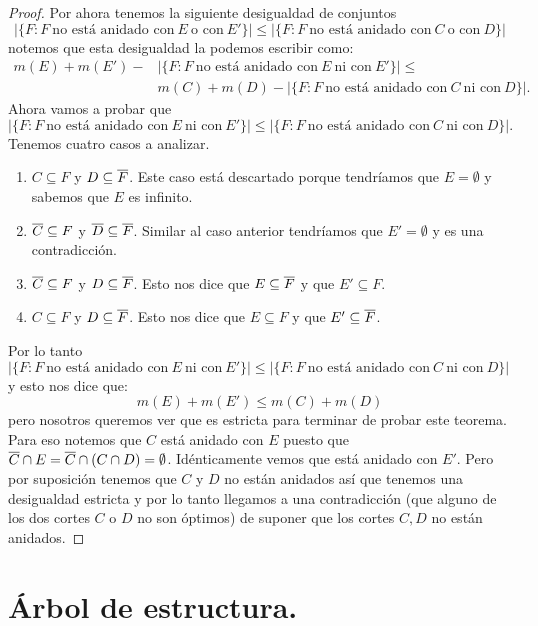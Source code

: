 \documentclass[tesis.tex]{subfiles}
\begin{document}
\begin{proof}
	Por ahora tenemos la siguiente desigualdad de conjuntos
	\[
		|\{ F : F \ \text{no está anidado con} \ E \ \text{o con} \  E' \}| \le |\{ F : F \  \text{no está anidado con} \ C \ \text{o con} \ D \}|
	\]
	notemos que esta desigualdad la podemos escribir como:
	\begin{align*}
		m(E) + m(E') - &|\{ F : F \ \text{no está anidado con} \ E \ \text{ni con} \ E' \}| \le \\
		&m(C) + m(D) - |\{ F : F \ \text{no está anidado con} \ C \ \text{ni con} \ D \}|.
	\end{align*}
	Ahora vamos a probar que 
	\[
		|\{ F : F \ \text{no está anidado con} \ E \ \text{ni con} \ E' \}| \le |\{ F : F \ \text{no está anidado con} \ C \ \text{ni con} \ D \}|.
	\]
	Tenemos cuatro casos a analizar.
	\begin{enumerate}
		\item $C \subseteq F$ y $D \subseteq \overline F$.
		Este caso está descartado porque tendríamos que $E=\emptyset$ y sabemos que $E$ es infinito. 
		\item $\overline C \subseteq F$ y $\overline D \subseteq \overline F$.
		Similar al caso anterior tendríamos que $E' = \emptyset$ y es una contradicción.
		\item $\overline C \subseteq F$ y $D \subseteq \overline F$.
		Esto nos dice que $E \subseteq \overline F$ y que $E' \subseteq F$.
		\item $ C \subseteq F$ y $D \subseteq \overline F$.
		Esto nos dice que $E \subseteq F$ y que $E' \subseteq \overline F$.
	\end{enumerate}
	Por lo tanto $|\{ F : F \ \text{no está anidado con} \ E \ \text{ni con} \ E' \}| \le |\{ F : F \ \text{no está anidado con} \ C \ \text{ni con} \ D \}|$ y esto nos dice que:
	\[
		m(E) + m(E') \le m(C) + m(D)
	\]
	pero nosotros queremos ver que es estricta para terminar de probar este teorema.
	Para eso notemos que $C$ está anidado con $E$ puesto que $\overline C \cap E = \overline C \cap (C \cap D) = \emptyset$.
	Idénticamente vemos que está anidado con $E'$.
	Pero por suposición tenemos que $C$ y $D$ no están anidados así que tenemos una desigualdad estricta y por lo tanto llegamos a una contradicción (que alguno de los dos cortes $C$ o $D$ no son óptimos) de suponer que los cortes $C,D$ no están anidados.
\end{proof}

\section{Árbol de estructura.}\label{secc_arbol_estr}
\end{document}
